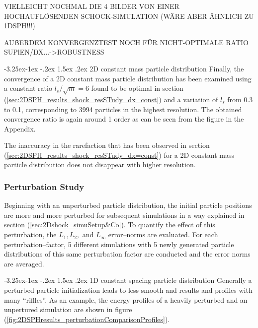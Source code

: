 \documentclass{report}
\makeatletter
\renewcommand\paragraph{\@startsection{paragraph}{4}{\z@}%
  {-3.25ex\@plus -1ex \@minus -.2ex}%
  {1.5ex \@plus .2ex}%
  {\normalfont\normalsize\bfseries}}
\makeatother
\begin{document}
VIELLEICHT NOCHMAL DIE 4 BILDER VON EINER HOCHAUFLÖSENDEN SCHOCK-SIMULATION (WÄRE ABER ÄHNLICH ZU 1DSPH!!!)

AUẞERDEM KONVERGENZTEST NOCH FÜR NICHT-OPTIMALE RATIO SUPlEN/DX...->ROBUSTNESS


\paragraph{2D constant mass particle distribution}
Finally, the convergence of a 2D constant mass particle distribution has been examined using a constant ratio $l_s/\sqrt{m}=6$ found to be optimal in section (\ref{sec:2DSPH_results_shock_resSTudy_dx=const}) and a variation of $l_s$ from 0.3 to 0.1, corresponding to 3994 particles in the highest resolution.
The obtained convergence ratio is again around 1 order as can be seen from the figure in the Appendix. 

The inaccuracy in the rarefaction that has been observed in section (\ref{sec:2DSPH_results_shock_resSTudy_dx=const}) for a 2D constant mass particle distribution does not disappear with higher resolution. 
 

\subsubsection{Perturbation Study}
Beginning with an unperturbed particle distribution, the initial particle positions are more and more perturbed for subsequent simulations in a way explained in section (\ref{sec:2Dshock_simuSetup&Co}). To quantify the effect of this perturbation, the $L_1, L_2,$ and $L_{\infty}$ error--norms are evaluated. For each perturbation--factor, 5 different simulations with 5 newly generated particle distributions of this same perturbation factor are conducted and the error norms are averaged.


\paragraph{1D constant spacing particle distribution}
Generally a perturbed particle initialization leads to less smooth and results and profiles with many ``riffles''. As an example, the energy profiles of a heavily perturbed and an unpertured simulation are shown in figure (\ref{fig:2DSPHresults_perturbationComparisonProfiles}).
\end{document}
